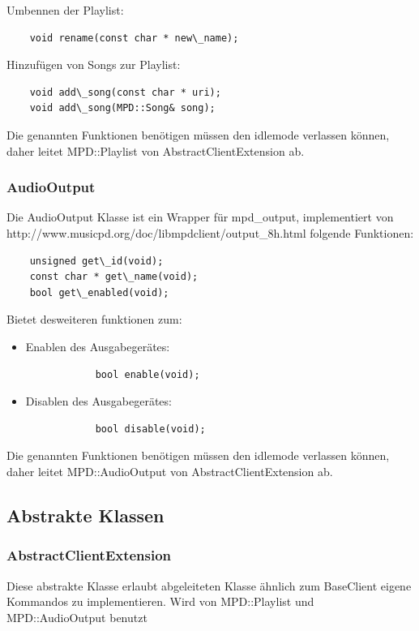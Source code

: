 Umbennen der Playlist:
\begin{verbatim}
    void rename(const char * new\_name);
\end{verbatim}

Hinzufügen von Songs zur Playlist:
\begin{verbatim}
    void add\_song(const char * uri);
    void add\_song(MPD::Song& song);
\end{verbatim}

Die genannten Funktionen benötigen müssen den idlemode verlassen können,
daher leitet MPD::Playlist von AbstractClientExtension ab.

\subsubsection{AudioOutput}
Die AudioOutput Klasse ist ein Wrapper für mpd\_output, implementiert von http://www.musicpd.org/doc/libmpdclient/output\_8h.html folgende Funktionen:
\begin{verbatim}
    unsigned get\_id(void);
    const char * get\_name(void);
    bool get\_enabled(void);
\end{verbatim}

Bietet desweiteren funktionen zum:
\begin{itemize}
    \item Enablen des Ausgabegerätes:
        \begin{verbatim}
            bool enable(void);
        \end{verbatim}
    \item Disablen des Ausgabegerätes:
        \begin{verbatim}
            bool disable(void);
        \end{verbatim}
\end{itemize}


Die genannten Funktionen benötigen müssen den idlemode verlassen können,
daher leitet MPD::AudioOutput von AbstractClientExtension ab. 

\subsection{Abstrakte Klassen}
\subsubsection{AbstractClientExtension}
Diese abstrakte Klasse erlaubt abgeleiteten Klasse ähnlich zum BaseClient eigene Kommandos zu implementieren.
Wird von MPD::Playlist und MPD::AudioOutput benutzt


